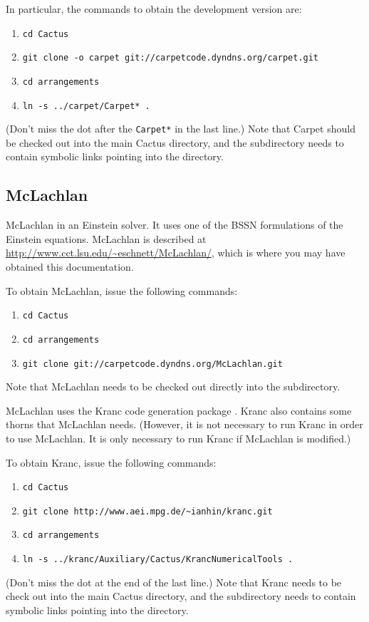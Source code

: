 In particular, the commands to obtain the development version are:
\begin{enumerate}
\item\verb+cd Cactus+
\item\verb+git clone -o carpet git://carpetcode.dyndns.org/carpet.git+
\item\verb+cd arrangements+
\item\verb+ln -s ../carpet/Carpet* .+
\end{enumerate}
(Don't miss the dot after the \verb+Carpet*+ in the last line.)  Note
that Carpet should be checked out into the main Cactus directory, and
the  subdirectory needs to contain symbolic links
pointing into the  directory.

\subsection{McLachlan}

McLachlan \cite{ES-Brown2007b, ES-mclachlanweb} in an Einstein solver.
It uses one of the BSSN formulations of the Einstein equations.
McLachlan is described at
\url{http://www.cct.lsu.edu/~eschnett/McLachlan/}, which is where you
may have obtained this documentation.

To obtain McLachlan, issue the following commands:
\begin{enumerate}
\item\verb+cd Cactus+
\item\verb+cd arrangements+
\item\verb+git clone git://carpetcode.dyndns.org/McLachlan.git+
\end{enumerate}
Note that McLachlan needs to be checked out directly into the
 subdirectory.

McLachlan uses the Kranc code generation package \cite{kranc04,
  Husa:2004ip, krancweb, ES-krancweb}.  Kranc also contains some
thorns that McLachlan needs.  (However, it is not necessary to run
Kranc in order to use McLachlan.  It is only necessary to run Kranc if
McLachlan is modified.)

To obtain Kranc, issue the following commands:
\begin{enumerate}
\item\verb+cd Cactus+
\item\verb+git clone http://www.aei.mpg.de/~ianhin/kranc.git+
\item\verb+cd arrangements+
\item\verb+ln -s ../kranc/Auxiliary/Cactus/KrancNumericalTools .+
\end{enumerate}
(Don't miss the dot at the end of the last line.)  Note that Kranc
needs to be check out into the main Cactus directory, and the
 subdirectory needs to contain symbolic links
pointing into the  directory.

